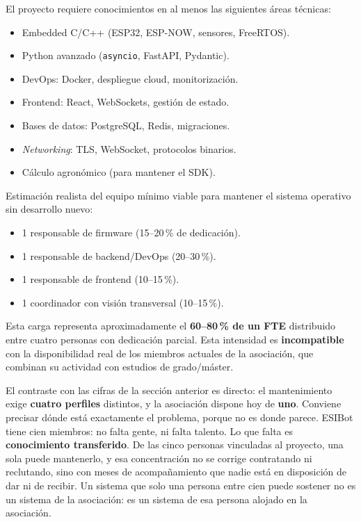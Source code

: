El proyecto requiere conocimientos en al menos las siguientes \'areas
t\'ecnicas:

\begin{itemize}[leftmargin=*]
    \item Embedded C/C++ (ESP32, ESP-NOW, sensores, FreeRTOS).
    \item Python avanzado (\texttt{asyncio}, FastAPI, Pydantic).
    \item DevOps: Docker, despliegue cloud, monitorizaci\'on.
    \item Frontend: React, WebSockets, gesti\'on de estado.
    \item Bases de datos: PostgreSQL, Redis, migraciones.
    \item \textit{Networking}: TLS, WebSocket, protocolos binarios.
    \item C\'alculo agron\'omico (para mantener el SDK).
\end{itemize}

Estimaci\'on realista del equipo m\'inimo viable para mantener el sistema
operativo sin desarrollo nuevo:

\begin{itemize}[leftmargin=*]
    \item 1 responsable de firmware (15--20\,\% de dedicaci\'on).
    \item 1 responsable de backend/DevOps (20--30\,\%).
    \item 1 responsable de frontend (10--15\,\%).
    \item 1 coordinador con visi\'on transversal (10--15\,\%).
\end{itemize}

Esta carga representa aproximadamente el \textbf{60--80\,\% de un FTE}
distribuido entre cuatro personas con dedicaci\'on parcial. Esta
intensidad es \textbf{incompatible} con la disponibilidad real de los
miembros actuales de la asociaci\'on, que combinan su actividad con
estudios de grado/m\'aster.

El contraste con las cifras de la secci\'on anterior es directo: el
mantenimiento exige \textbf{cuatro perfiles} distintos, y la asociaci\'on
dispone hoy de \textbf{uno}. Conviene precisar d\'onde est\'a exactamente
el problema, porque no es donde parece. ESIBot tiene cien miembros: no
falta gente, ni falta talento. Lo que falta es \textbf{conocimiento
transferido}. De las cinco personas vinculadas al proyecto, una sola
puede mantenerlo, y esa concentraci\'on no se corrige contratando ni
reclutando, sino con meses de acompa\~namiento que nadie est\'a en
disposici\'on de dar ni de recibir. Un sistema que solo una persona entre
cien puede sostener no es un sistema de la asociaci\'on: es un sistema de
esa persona alojado en la asociaci\'on.

